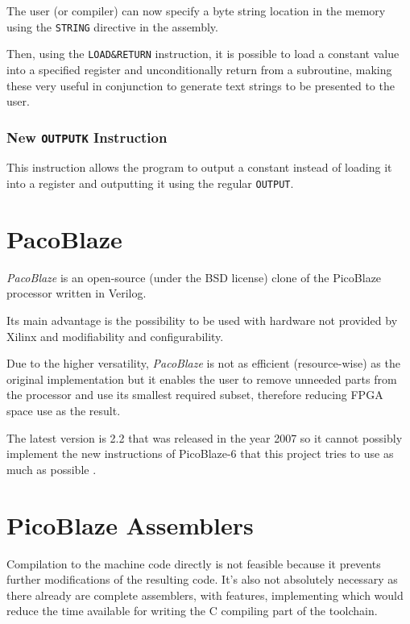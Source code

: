        The user (or compiler) can now specify a byte string location in the memory using the \texttt{STRING} directive in the assembly.

        Then, using the \texttt{LOAD\&RETURN} instruction, it is possible to load a constant value into a specified register and unconditionally return from a subroutine, making these very useful in conjunction to generate text strings to be presented to the user.

        \subsubsection{New \texttt{OUTPUTK} Instruction}

        This instruction allows the program to output a constant instead of loading it into a register and outputting it using the regular \texttt{OUTPUT}.

    \section{PacoBlaze}

    \emph{PacoBlaze} is an open-source (under the BSD license) clone of the PicoBlaze processor written in Verilog.

    Its main advantage is the possibility to be used with hardware not provided by Xilinx and modifiability and configurability. 

    Due to the higher versatility, \emph{PacoBlaze} is not as efficient (resource-wise) as the original implementation but it enables the user to remove unneeded parts from the processor and use its smallest required subset, therefore reducing FPGA space use as the result.

    The latest version is 2.2 that was released in the year 2007 so it cannot possibly implement the new instructions of PicoBlaze-6 that this project tries to use as much as possible \cite{PacoBlaze}.

    \section{PicoBlaze Assemblers}

        Compilation to the machine code directly is not feasible because it prevents further modifications of the resulting code. It's also not absolutely necessary as there already are complete assemblers, with features, implementing which would reduce the time available for writing the C compiling part of the toolchain.

